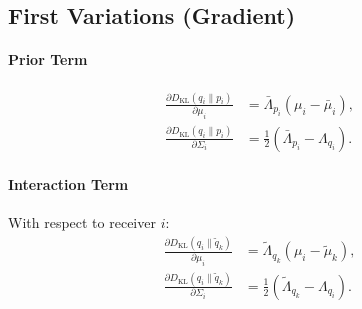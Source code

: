 \subsection{First Variations (Gradient)}

\paragraph{Prior Term}
\begin{align}
\frac{\partial D_{\mathrm{KL}}(q_i \| p_i)}{\partial \mu_i} &= \bar{\Lambda}_{p_i}(\mu_i - \bar{\mu}_i), \\
\frac{\partial D_{\mathrm{KL}}(q_i \| p_i)}{\partial \Sigma_i} &= \frac{1}{2}(\bar{\Lambda}_{p_i} - \Lambda_{q_i}).
\end{align}

\paragraph{Interaction Term}

With respect to receiver $i$:
\begin{align}
\frac{\partial D_{\mathrm{KL}}(q_i \| \tilde{q}_k)}{\partial \mu_i} &= \tilde{\Lambda}_{q_k}(\mu_i - \tilde{\mu}_k), \\
\frac{\partial D_{\mathrm{KL}}(q_i \| \tilde{q}_k)}{\partial \Sigma_i} &= \frac{1}{2}(\tilde{\Lambda}_{q_k} - \Lambda_{q_i}).
\end{align}

